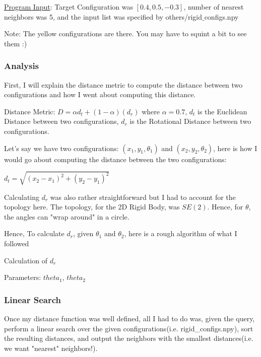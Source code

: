 \documentclass{article}
\begin{document}
\underline{Program Input}: Target Configuration was $[0.4, 0.5, -0.3]$, number of nearest neighbors was 5, and the input list was specified by others/rigid$\_$configs.npy

Note: The yellow configurations are there. You may have to squint a bit to see them :) \newline

\subsubsection{Analysis}
First, I will explain the distance metric to compute the distance between two configurations and how I went about computing this distance.  

Distance Metric: $D = \alpha d_t + (1 - \alpha) (d_r)$ \newline 
where $\alpha = 0.7$, $d_t$ is the Euclidean Distance between two configurations, $d_r$ is the Rotational Distance between two configurations. 

Let's say we have two configurations: $(x_1, y_1, \theta_1)$ and $(x_2, y_2, \theta_2)$, here is how I would go about computing the distance between the two configurations: \newline 

$d_t = \sqrt{(x_2 - x_1)^2 + (y_2 - y_1)^2}$ \newline 

Calculating $d_r$ was also rather straightforward but I had to account for the topology here. The topology, for the 2D Rigid Body, was $SE(2)$. Hence, for $\theta$, the angles can "wrap around" in a circle. 

Hence, To calculate $d_r$, given $\theta_1$ and $\theta_2$, here is a rough algorithm of what I followed


\begin{algorithm}
\caption{Calculation of $d_r$}
\begin{algorithmic}
\STATE Parameters: $theta_1$, $theta_2$


\end{algorithmic}
\end{algorithm}

\subsubsection{Linear Search}
Once my distance function was well defined, all I had to do was, given the query, perform a linear search over the given configurations(i.e. rigid\_configs.npy), sort the resulting distances, and output the neighbors with the smallest distances(i.e. we want "nearest" neighbors!). 
\end{document}
